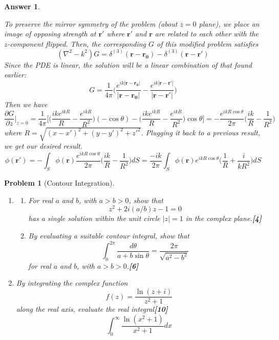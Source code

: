 \documentclass[a4paper]{article}
\newtheorem{ans}{Answer}[section]
\theoremstyle{new}
\newtheorem{qns}{Problem}[section]
\begin{document}
\begin{ans}
\begin{enumerate}[label=(\roman*)]
\begin{enumerate}[label=(\alph*)]
To preserve the mirror symmetry of the problem (about $z=0$ plane), we place an image of opposing strength at $\mathbf{r'}$ where $\mathbf{r'}$ and $\mathbf{r}$ are related to each other with the $z$-component flipped. Then, the corresponding $G$ of this modified problem satisfies
$$(\nabla^2-k^2)G=\delta^{(3)}(\mathbf{r}-\mathbf{r_0})-\delta^{(3)}(\mathbf{r}-\mathbf{r'})$$
Since the PDE is linear, the solution will be a linear combination of that found earlier:
$$G=\frac{1}{4\pi}\bigg(\frac{e^{ik|\mathbf{r}-\mathbf{r_0}|}}{|\mathbf{r}-\mathbf{r_0}|}-\frac{e^{ik|\mathbf{r}-\mathbf{r'}|}}{|\mathbf{r}-\mathbf{r'}|}\bigg)$$
Then we have
$$\frac{\partial G}{\partial z}\bigg|_{z=0}=\frac{1}{4\pi}\bigg[\bigg(\frac{ike^{ikR}}{R}-\frac{e^{ikR}}{R^2}\bigg)(-\cos\theta)-\bigg(\frac{ike^{ikR}}{R}-\frac{e^{ikR}}{R^2}\bigg)\cos\theta\bigg]=-\frac{e^{ikR\cos\theta}}{2\pi}\bigg(\frac{ik}{R}-\frac{1}{R^2}\bigg)$$
where $R=\sqrt{(x-x')^2+(y-y')^2+z'^2}$. Plugging it back to a previous result, we get our desired result.
$$\phi(\mathbf{r'})=-\int_S\phi(\mathbf{r})\frac{e^{ikR\cos\theta}}{2\pi}\bigg(\frac{ik}{R}-\frac{1}{R^2}\bigg)dS=\frac{-ik}{2\pi}\int_S\phi(\mathbf{r})e^{ikR\cos\theta}\bigg(\frac{1}{R}+\frac{i}{kR^2}\bigg)dS$$
\end{enumerate}
\end{enumerate}
\end{ans}
\newpage
\begin{qns}[Contour Integration]\leavevmode
\begin{enumerate}[label=(\roman*)]
\item 
\begin{enumerate}[label=(\alph*)]
\item For real $a$ and $b$, with $a > b > 0$, show that
$$z^2 + 2i(a/b)z − 1 = 0$$
has a single solution within the unit circle $|z| = 1$ in the complex plane.\hfill\textbf{[4]}
\item By evaluating a suitable contour integral, show that
$$\int_0^{2\pi}\frac{d\theta}{a+b\sin\theta}=\frac{2\pi}{\sqrt{a^2-b^2}}$$
for real $a$ and $b$, with $a > b > 0$.\hfill\textbf{[6]}
\end{enumerate}
\item By integrating the complex function
$$f(z)=\frac{\ln(z+i)}{z^2+1}$$
along the real axis, evaluate the real integral\hfill\textbf{[10]}
$$\int_0^\infty\frac{\ln(x^2+1)}{x^2+1}dx$$
\end{enumerate}
\end{qns}
\end{document}
